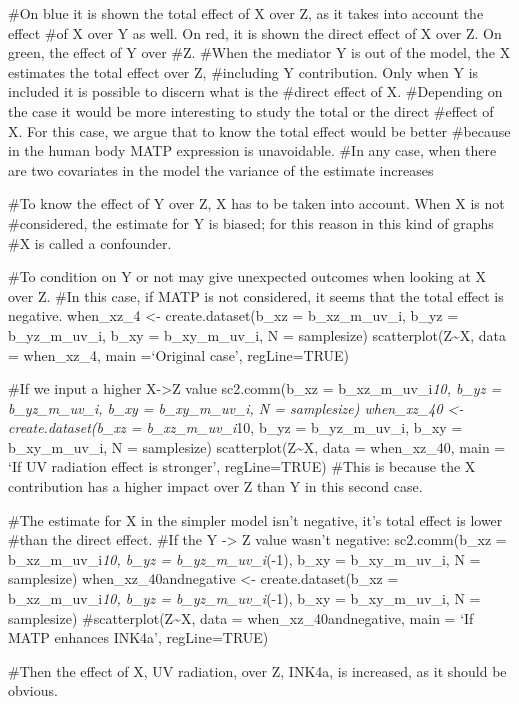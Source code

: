 \documentclass[
]{article}
\begin{document}
\#On blue it is shown the total effect of X over Z, as it takes into
account the effect \#of X over Y as well. On red, it is shown the direct
effect of X over Z. On green, the effect of Y over \#Z. \#When the
mediator Y is out of the model, the X estimates the total effect over Z,
\#including Y contribution. Only when Y is included it is possible to
discern what is the \#direct effect of X. \#Depending on the case it
would be more interesting to study the total or the direct \#effect of
X. For this case, we argue that to know the total effect would be better
\#because in the human body MATP expression is unavoidable. \#In any
case, when there are two covariates in the model the variance of the
estimate increases

\#To know the effect of Y over Z, X has to be taken into account. When X
is not \#considered, the estimate for Y is biased; for this reason in
this kind of graphs \#X is called a confounder.

\#To condition on Y or not may give unexpected outcomes when looking at
X over Z. \#In this case, if MATP is not considered, it seems that the
total effect is negative. when\_xz\_4 \textless- create.dataset(b\_xz =
b\_xz\_m\_uv\_i, b\_yz = b\_yz\_m\_uv\_i, b\_xy = b\_xy\_m\_uv\_i, N =
samplesize) scatterplot(Z\textasciitilde X, data = when\_xz\_4, main
=`Original case', regLine=TRUE)

\#If we input a higher X-\textgreater Z value sc2.comm(b\_xz =
b\_xz\_m\_uv\_i\emph{10, b\_yz = b\_yz\_m\_uv\_i, b\_xy =
b\_xy\_m\_uv\_i, N = samplesize) when\_xz\_40 \textless-
create.dataset(b\_xz = b\_xz\_m\_uv\_i}10, b\_yz = b\_yz\_m\_uv\_i,
b\_xy = b\_xy\_m\_uv\_i, N = samplesize) scatterplot(Z\textasciitilde X,
data = when\_xz\_40, main = `If UV radiation effect is stronger',
regLine=TRUE) \#This is because the X contribution has a higher impact
over Z than Y in this second case.

\#The estimate for X in the simpler model isn't negative, it's total
effect is lower \#than the direct effect. \#If the Y -\textgreater{} Z
value wasn't negative: sc2.comm(b\_xz = b\_xz\_m\_uv\_i\emph{10, b\_yz =
b\_yz\_m\_uv\_i}(-1), b\_xy = b\_xy\_m\_uv\_i, N = samplesize)
when\_xz\_40andnegative \textless- create.dataset(b\_xz =
b\_xz\_m\_uv\_i\emph{10, b\_yz = b\_yz\_m\_uv\_i}(-1), b\_xy =
b\_xy\_m\_uv\_i, N = samplesize) \#scatterplot(Z\textasciitilde X, data
= when\_xz\_40andnegative, main = `If MATP enhances INK4a',
regLine=TRUE)

\#Then the effect of X, UV radiation, over Z, INK4a, is increased, as it
should be obvious.
\end{document}
